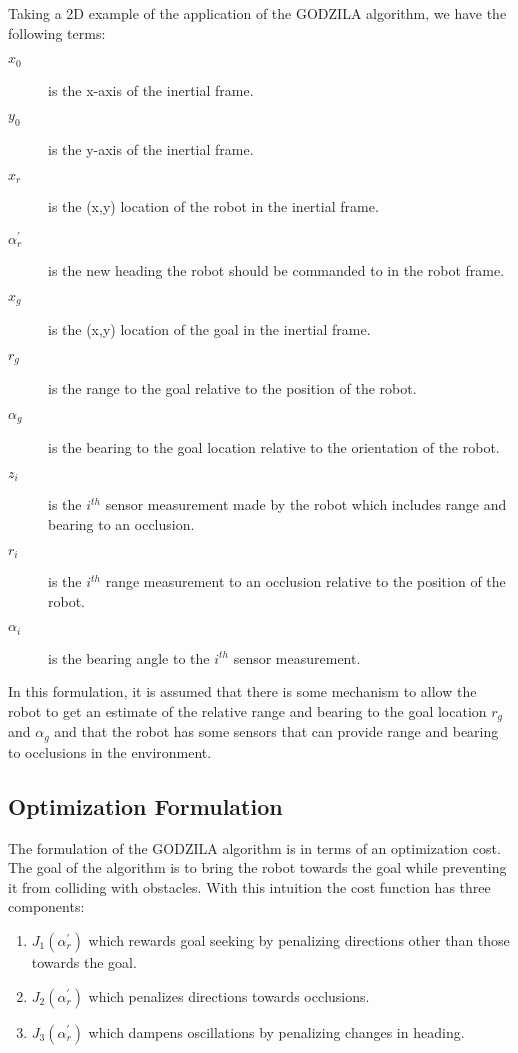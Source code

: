 Taking a 2D example of the application of the GODZILA algorithm, we have the following terms:

\begin{description}
	\item[$x_0$] is the x-axis of the inertial frame.
	\item[$y_0$] is the y-axis of the inertial frame.
	\item[$x_r$] is the (x,y) location of the robot in the inertial frame.
	\item[$\alpha_r^\prime$] is the new heading the robot should be commanded to in the robot frame.
	\item[$x_g$] is the (x,y) location of the goal in the inertial frame.
	\item[$r_g$] is the range to the goal relative to the position of the robot.
	\item[$\alpha_g$] is the bearing to the goal location relative to the orientation of the robot.
	\item[$z_i$] is the $i^{th}$ sensor measurement made by the robot which includes range and bearing to an occlusion.
	\item[$r_i$] is the $i^{th}$ range measurement to an occlusion relative to the position of the robot.
	\item[$\alpha_i$] is the bearing angle to the $i^{th}$ sensor measurement.
\end{description}

In this formulation, it is assumed that there is some mechanism to allow the robot to get an estimate of the relative
range and bearing to the goal location $r_g$ and $\alpha_g$ and that the robot has some sensors that can provide range
and bearing to occlusions in the environment.

\subsection{Optimization Formulation} \label{subsec:navoptimization}
The formulation of the GODZILA algorithm is in terms of an optimization cost. The goal of the algorithm is to bring the robot
towards the goal while preventing it from colliding with obstacles. With this intuition the cost function has three components:

\begin{enumerate}
	\item $J_1(\alpha_r^\prime)$ which rewards goal seeking by penalizing directions other than those towards the goal.
	\item $J_2(\alpha_r^\prime)$ which penalizes directions towards occlusions.
	\item $J_3(\alpha_r^\prime)$ which dampens oscillations by penalizing changes in heading.
\end{enumerate}

